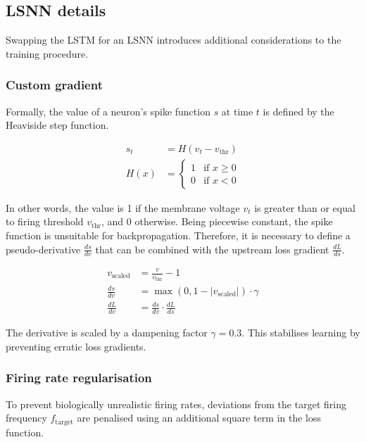 \documentclass[../../report.tex]{subfiles}
\begin{document}
\subsection{LSNN details}

Swapping the LSTM for an LSNN introduces additional considerations to the
training procedure.

\subsubsection{Custom gradient}
Formally, the value of a neuron's spike function \(s\) at time \(t\) is defined
by the Heaviside step function.

\begin{align*}
  s_t &= H(v_t - v_\mathrm{thr})
  \\
  H(x) &=
  \begin{cases}
  1 & \text{if } x \geq 0 \\
  0 & \text{if } x < 0
  \end{cases}
\end{align*}

In other words, the value is 1 if the membrane voltage \(v_t\) is greater than
or equal to firing threshold \(v_\mathrm{thr}\), and 0 otherwise. Being
piecewise constant, the spike function is unsuitable for backpropagation.
Therefore, it is necessary to define a pseudo-derivative \(\frac{ds}{dv}\) that
can be combined with the upstream loss gradient \(\frac{dL}{ds}\).

\begin{align*}
  v_\mathrm{scaled} &= \frac{v}{v_\mathrm{thr}} - 1
  \\
  \frac{ds}{dv} &= \max(0, 1 - \left| v_\mathrm{scaled} \right|) \cdot \gamma
  \\
  \frac{dL}{dv} &= \frac{ds}{dv} \cdot \frac{dL}{ds}
\end{align*}

The derivative is scaled by a dampening factor \(\gamma = 0.3\). This stabilises
learning by preventing erratic loss gradients.


\subsubsection{Firing rate regularisation}

To prevent biologically unrealistic firing rates, deviations from the target
firing frequency \(f_\mathrm{target}\) are penalised using an additional square
term in the loss function.
\end{document}
